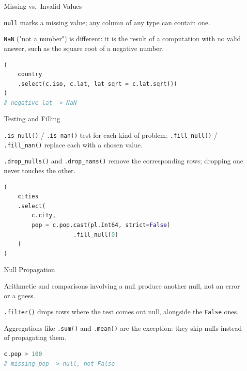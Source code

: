 \documentclass[8pt,aspectratio=169]{beamer}
\begin{document}
\begin{frame}[fragile]{Missing vs.\ Invalid Values}
\begin{splitcode}{%

\texttt{null} marks a missing value; any column of any type can contain one.

\texttt{NaN} ("not a number") is different: it is the result of a computation with no valid answer, such as the square root of a negative number.

}
\begin{lstlisting}[language=Python]
(
    country
    .select(c.iso, c.lat, lat_sqrt = c.lat.sqrt())
)
# negative lat -> NaN
\end{lstlisting}
\end{splitcode}
\end{frame}

\begin{frame}[fragile]{Testing and Filling}
\begin{splitcode}{%

\texttt{.is\_null()} / \texttt{.is\_nan()} test for each kind of problem; \texttt{.fill\_null()} / \texttt{.fill\_nan()} replace each with a chosen value.

\texttt{.drop\_nulls()} and \texttt{.drop\_nans()} remove the corresponding rows; dropping one never touches the other.

}
\begin{lstlisting}[language=Python]
(
    cities
    .select(
        c.city,
        pop = c.pop.cast(pl.Int64, strict=False)
                    .fill_null(0)
    )
)
\end{lstlisting}
\end{splitcode}
\end{frame}

\begin{frame}[fragile]{Null Propagation}
\begin{splitcode}{%

Arithmetic and comparisons involving a null produce another null, not an error or a guess.

\texttt{.filter()} drops rows where the test comes out null, alongside the \texttt{False} ones.

Aggregations like \texttt{.sum()} and \texttt{.mean()} are the exception: they skip nulls instead of propagating them.

}
\begin{lstlisting}[language=Python]
c.pop > 100
# missing pop -> null, not False
\end{lstlisting}
\end{splitcode}
\end{frame}
\end{document}
